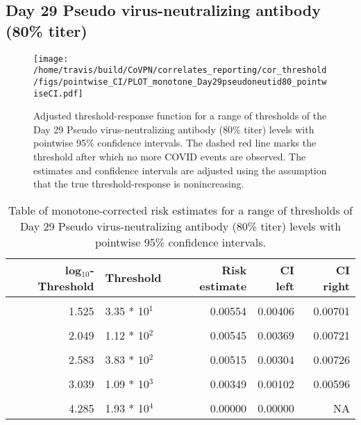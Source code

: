 \documentclass[]{book}
\theoremstyle{definition}
\theoremstyle{definition}
\theoremstyle{definition}
\newcommand{\1}{\mathbbm{1}}
\begin{document}
\clearpage

\clearpage

\clearpage

\hypertarget{day-29-pseudo-virus-neutralizing-antibody-80-titer-1}{%
\subsection{Day 29 Pseudo virus-neutralizing antibody (80\% titer)}\label{day-29-pseudo-virus-neutralizing-antibody-80-titer-1}}

\begin{figure}[H]
\centering
\texttt{[image: /home/travis/build/CoVPN/correlates\_reporting/cor\_threshold/figs/pointwise\_CI/PLOT\_monotone\_Day29pseudoneutid80\_pointwiseCI.pdf]}
\caption{Adjusted threshold-response function for a range of thresholds of the
  Day 29 Pseudo virus-neutralizing antibody (80\% titer) levels with pointwise 95\% confidence intervals. The dashed red line marks the threshold after which no more COVID events are observed. The estimates and confidence intervals are adjusted using the assumption that the true threshold-response is nonincreasing.}
\end{figure}
\begin{table}[!h]

\caption{\label{tab:unnamed-chunk-377}Table of monotone-corrected risk estimates for a range of thresholds of Day 29 Pseudo virus-neutralizing antibody (80\% titer) levels with pointwise 95\% confidence intervals.}
\centering
\begin{tabular}[t]{rlrrr}
\toprule
log$_{10}$-Threshold & Threshold & Risk estimate & CI left & CI right\\
\midrule
\cellcolor{gray!6}{0.699} & \cellcolor{gray!6}{5.00 * 10$^0$} & \cellcolor{gray!6}{0.00585} & \cellcolor{gray!6}{0.00442} & \cellcolor{gray!6}{0.00727}\\
1.525 & 3.35 * 10$^1$ & 0.00554 & 0.00406 & 0.00701\\
\cellcolor{gray!6}{1.840} & \cellcolor{gray!6}{6.92 * 10$^1$} & \cellcolor{gray!6}{0.00554} & \cellcolor{gray!6}{0.00386} & \cellcolor{gray!6}{0.00721}\\
2.049 & 1.12 * 10$^2$ & 0.00545 & 0.00369 & 0.00721\\
\cellcolor{gray!6}{2.276} & \cellcolor{gray!6}{1.89 * 10$^2$} & \cellcolor{gray!6}{0.00534} & \cellcolor{gray!6}{0.00343} & \cellcolor{gray!6}{0.00726}\\
2.583 & 3.83 * 10$^2$ & 0.00515 & 0.00304 & 0.00726\\
\cellcolor{gray!6}{2.785} & \cellcolor{gray!6}{6.10 * 10$^2$} & \cellcolor{gray!6}{0.00515} & \cellcolor{gray!6}{0.00244} & \cellcolor{gray!6}{0.00786}\\
3.039 & 1.09 * 10$^3$ & 0.00349 & 0.00102 & 0.00596\\
\cellcolor{gray!6}{3.351} & \cellcolor{gray!6}{2.24 * 10$^3$} & \cellcolor{gray!6}{0.00242} & \cellcolor{gray!6}{0.00005} & \cellcolor{gray!6}{0.00480}\\
4.285 & 1.93 * 10$^4$ & 0.00000 & 0.00000 & NA\\
\bottomrule
\end{tabular}
\end{table}
\end{document}
